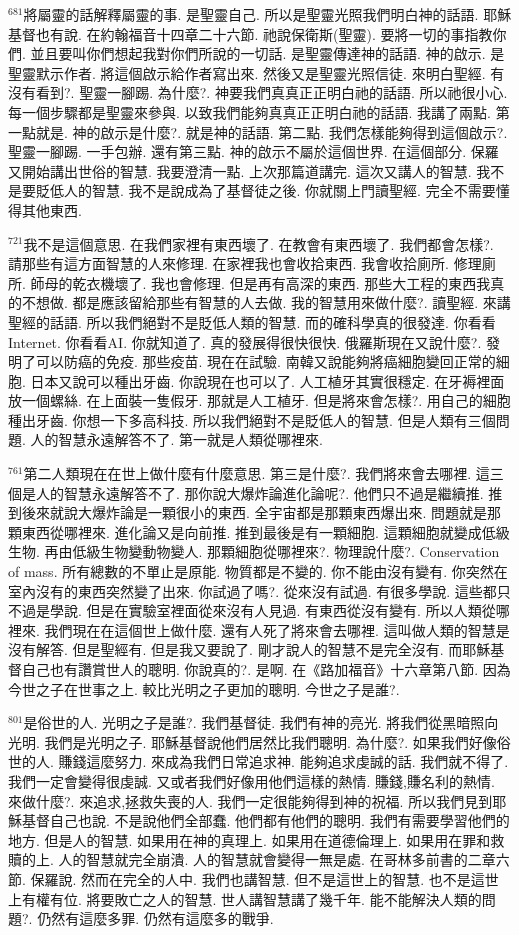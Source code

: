 \documentclass{book}
\begin{document}
$^{681}$將屬靈的話解釋屬靈的事.
是聖靈自己.
所以是聖靈光照我們明白神的話語.
耶穌基督也有說.
在約翰福音十四章二十六節.
祂說保衛斯(聖靈).
要將一切的事指教你們.
並且要叫你們想起我對你們所說的一切話.
是聖靈傳達神的話語.
神的啟示.
是聖靈默示作者.
將這個啟示給作者寫出來.
然後又是聖靈光照信徒.
來明白聖經.
有沒有看到?.
聖靈一腳踢.
為什麼?.
神要我們真真正正明白祂的話語.
所以祂很小心.
每一個步驟都是聖靈來參與.
以致我們能夠真真正正明白祂的話語.
我講了兩點.
第一點就是.
神的啟示是什麼?.
就是神的話語.
第二點.
我們怎樣能夠得到這個啟示?.
聖靈一腳踢.
一手包辦.
還有第三點.
神的啟示不屬於這個世界.
在這個部分.
保羅又開始講出世俗的智慧.
我要澄清一點.
上次那篇道講完.
這次又講人的智慧.
我不是要貶低人的智慧.
我不是說成為了基督徒之後.
你就關上門讀聖經.
完全不需要懂得其他東西.

$^{721}$我不是這個意思.
在我們家裡有東西壞了.
在教會有東西壞了.
我們都會怎樣?.
請那些有這方面智慧的人來修理.
在家裡我也會收拾東西.
我會收拾廁所.
修理廁所.
師母的乾衣機壞了.
我也會修理.
但是再有高深的東西.
那些大工程的東西我真的不想做.
都是應該留給那些有智慧的人去做.
我的智慧用來做什麼?.
讀聖經.
來講聖經的話語.
所以我們絕對不是貶低人類的智慧.
而的確科學真的很發達.
你看看Internet.
你看看AI.
你就知道了.
真的發展得很快很快.
俄羅斯現在又說什麼?.
發明了可以防癌的免疫.
那些疫苗.
現在在試驗.
南韓又說能夠將癌細胞變回正常的細胞.
日本又說可以種出牙齒.
你說現在也可以了.
人工植牙其實很穩定.
在牙褥裡面放一個螺絲.
在上面裝一隻假牙.
那就是人工植牙.
但是將來會怎樣?.
用自己的細胞種出牙齒.
你想一下多高科技.
所以我們絕對不是貶低人的智慧.
但是人類有三個問題.
人的智慧永遠解答不了.
第一就是人類從哪裡來.

$^{761}$第二人類現在在世上做什麼有什麼意思.
第三是什麼?.
我們將來會去哪裡.
這三個是人的智慧永遠解答不了.
那你說大爆炸論進化論呢?.
他們只不過是繼續推.
推到後來就說大爆炸論是一顆很小的東西.
全宇宙都是那顆東西爆出來.
問題就是那顆東西從哪裡來.
進化論又是向前推.
推到最後是有一顆細胞.
這顆細胞就變成低級生物.
再由低級生物變動物變人.
那顆細胞從哪裡來?.
物理說什麼?.
Conservation of mass.
所有總數的不單止是原能.
物質都是不變的.
你不能由沒有變有.
你突然在室內沒有的東西突然變了出來.
你試過了嗎?.
從來沒有試過.
有很多學說.
這些都只不過是學說.
但是在實驗室裡面從來沒有人見過.
有東西從沒有變有.
所以人類從哪裡來.
我們現在在這個世上做什麼.
還有人死了將來會去哪裡.
這叫做人類的智慧是沒有解答.
但是聖經有.
但是我又要說了.
剛才說人的智慧不是完全沒有.
而耶穌基督自己也有讚賞世人的聰明.
你說真的?.
是啊.
在《路加福音》十六章第八節.
因為今世之子在世事之上.
較比光明之子更加的聰明.
今世之子是誰?.

$^{801}$是俗世的人.
光明之子是誰?.
我們基督徒.
我們有神的亮光.
將我們從黑暗照向光明.
我們是光明之子.
耶穌基督說他們居然比我們聰明.
為什麼?.
如果我們好像俗世的人.
賺錢這麼努力.
來成為我們日常追求神.
能夠追求虔誠的話.
我們就不得了.
我們一定會變得很虔誠.
又或者我們好像用他們這樣的熱情.
賺錢,賺名利的熱情.
來做什麼?.
來追求,拯救失喪的人.
我們一定很能夠得到神的祝福.
所以我們見到耶穌基督自己也說.
不是說他們全部蠢.
他們都有他們的聰明.
我們有需要學習他們的地方.
但是人的智慧.
如果用在神的真理上.
如果用在道德倫理上.
如果用在罪和救贖的上.
人的智慧就完全崩潰.
人的智慧就會變得一無是處.
在哥林多前書的二章六節.
保羅說.
然而在完全的人中.
我們也講智慧.
但不是這世上的智慧.
也不是這世上有權有位.
將要敗亡之人的智慧.
世人講智慧講了幾千年.
能不能解決人類的問題?.
仍然有這麼多罪.
仍然有這麼多的戰爭.
\end{document}
